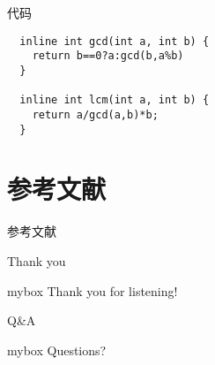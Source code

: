 \documentclass[UTF8,10pt,aspectratio=43]{ctexbeamer}
\begin{document}
\begin{frame}[fragile]{代码}
\begin{lstlisting}
  inline int gcd(int a, int b) { 
    return b==0?a:gcd(b,a%b)
  }

  inline int lcm(int a, int b) {
    return a/gcd(a,b)*b;
  }
\end{lstlisting}
\end{frame}

\section{参考文献}
\begin{frame}{参考文献}


\end{frame}

\begin{frame}{Thank you}
  \begin{center}
    \begin{minipage}{1\textwidth}
      \begin{beamercolorbox}[wd=0.70\textwidth, rounded=true, shadow=true]{mybox}
      \LARGE \centering Thank you for listening!  %
      \end{beamercolorbox}
    \end{minipage}
    \end{center}
\end{frame}

\begin{frame}{Q\&A}
\begin{center}
	\begin{minipage}{1\textwidth}
		\begin{beamercolorbox}[wd=0.70\textwidth, rounded=true, shadow=true]{mybox}
			\LARGE \centering  Questions?  %
		\end{beamercolorbox}
	\end{minipage}
\end{center}
\end{frame}
\end{document}
